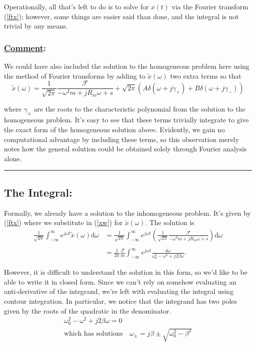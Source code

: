 \documentclass{article}
\begin{document}
Operationally, all that's left to do is to solve for $x(t)$ via the Fourier transform (\ref{ftx}); however, some things are easier said than done, and the integral is not trivial by any means.

\newpage


\subsubsection*{\underline{Comment}:}

We could have also included the solution to the homogeneous problem here using the method of Fourier transforms by adding to $ \tilde{x}(\omega) $ two extra terms so that
\[
  \tilde{x}(\omega) = \frac{1}{\sqrt{2\pi}} \frac{ \mathscr{F} }{ -\omega^2 m + j R_m \omega + s } + \sqrt{2 \pi}(A \delta(\omega + j \gamma_+)
                      + B \delta( \omega + j \gamma_-) )
\]

where $ \gamma_{\pm} $ are the roots to the characteristic polynomial from the solution to the homogeneous problem. It's easy to see that these terms trivially integrate to give the exact form of the homogeneous solution above. Evidently, we gain no computational advantage by including these terms, so this observation merely notes how the general solution could be obtained solely through Fourier analysis alone.

\noindent\rule[0.5ex]{\linewidth}{1pt}

\subsection*{The Integral:}

Formally, we already have a solution to the inhomogeneous problem. It's given by (\ref{ftx}) where we substitute in (\ref{xw}) for $\tilde{x} (\omega) $. The solution is
\[
  \begin{split}
    \frac{1}{\sqrt{2\pi}} \int_{-\infty}^{\infty} e^ {j \omega t} \tilde{x}(\omega) \mathrm{d} \omega
    &= \frac{1}{\sqrt{2\pi}} \int_{-\infty}^{\infty} e^ {j \omega t} ( \frac{1}{\sqrt{2\pi}} \frac{ \mathscr{F} }{ -\omega^2 m + j R_m \omega + s }) \mathrm{d} \omega
    \\
    \\
    &= \frac{1}{2 \pi} \frac{ \mathscr{F} }{m} \int_{-\infty}^{\infty} e^{j \omega t} \frac{  \dd{\omega} }{ \omega_0^2 - \omega^2 + j 2 \beta \omega }.
  \end{split}
\]

However, it is difficult to understand the solution in this form, so we'd like to be able to write it in closed form.
Since we can't rely on somehow evaluating an anti-derivative of the integrand, we're left with evaluating the integral
using contour integration. In particular, we notice that the integrand has two poles given by the roots
of the quadratic in the denominator.
  \begin{gather*}
    \omega_0^2 - \omega^2 + j 2 \beta \omega = 0 \\
    \text{which has solutions} \quad \omega_{\pm} = j \beta \pm \sqrt{ \omega_{0}^2 - \beta^2}
  \end{gather*}
\end{document}
